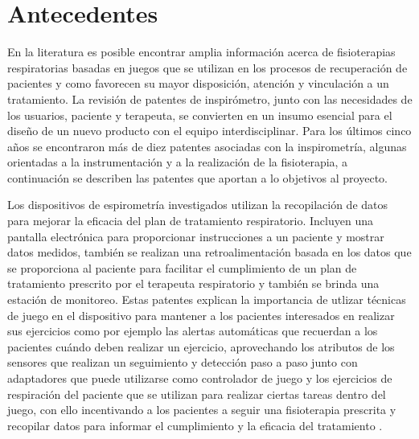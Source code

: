 

\section{Antecedentes}

En la literatura es posible encontrar amplia informaci\'on acerca de fisioterapias respiratorias basadas en juegos que se utilizan en los procesos de recuperaci\'on de pacientes y como favorecen su mayor disposici\'on, atenci\'on y vinculaci\'on a un tratamiento. La revisi\'on de patentes de inspir\'ometro, junto con las necesidades de los usuarios, paciente y terapeuta, se convierten en un insumo esencial para el dise\~{n}o de un nuevo producto con el equipo interdisciplinar. 
Para los \'ultimos cinco a\~{n}os se encontraron m\'as de diez patentes asociadas con la inspirometr\'ia, algunas orientadas a la instrumentaci\'on y a la realizaci\'on de la fisioterapia, a continuaci\'on se describen las patentes que aportan a lo objetivos al proyecto. %


Los dispositivos de espirometr\'ia investigados utilizan la recopilaci\'on de datos para mejorar la eficacia del plan de tratamiento respiratorio. Incluyen una pantalla electr\'onica para proporcionar instrucciones a un paciente y mostrar datos medidos, tambi\'en se realizan una retroalimentaci\'on basada en los datos que se proporciona al paciente para facilitar el cumplimiento de un plan de tratamiento prescrito por el terapeuta respiratorio y tambi\'en se  brinda una estaci\'on de monitoreo. Estas patentes explican la importancia de utlizar  t\'ecnicas de juego en el dispositivo para mantener a los pacientes interesados en realizar sus ejercicios como por ejemplo las alertas autom\'aticas  que recuerdan a los pacientes cu\'ando deben realizar un ejercicio, aprovechando los atributos de los sensores que realizan un seguimiento y detecci\'on paso a paso junto con adaptadores que puede utilizarse como controlador de juego y los ejercicios de respiraci\'on del paciente que se utilizan para realizar ciertas tareas dentro del juego, con ello incentivando a los pacientes a seguir una fisioterapia prescrita y recopilar datos para informar el cumplimiento y la eficacia del tratamiento \cite{46}.

